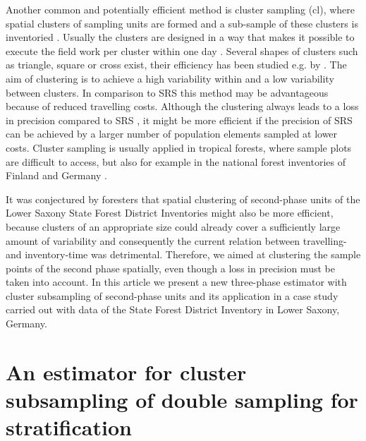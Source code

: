 Another common and potentially efficient method is cluster sampling (cl), where spatial clusters of sampling units are formed and a sub-sample of these clusters is inventoried \citep{Cochran_1977, Gregoire_2008}. Usually the clusters are designed in a way that makes it possible to execute the field work per cluster within one day \citep{Kleinn_1996}. Several shapes of clusters such as triangle, square or cross exist, their efficiency has been studied e.g. by \citet{Kleinn_1994,Kleinn_1996}. The aim of clustering is to achieve a high variability within and a low variability between clusters. In comparison to SRS this method may be advantageous because of reduced travelling costs. Although the clustering always leads to a loss in precision compared to SRS \citep{Cochran_1977}, it might be more efficient if the precision of SRS can be achieved by a larger number of population elements sampled at lower costs. Cluster sampling is usually applied in tropical forests, where sample plots are difficult to access, but 
also for example in the national forest inventories of Finland and Germany \citep{NFI_2009}. 

It was conjectured by foresters that spatial clustering of second-phase units of the Lower Saxony State Forest District Inventories might also be more efficient, because clusters of an appropriate size could already cover a sufficiently large amount of variability and consequently the current relation between travelling- and inventory-time was detrimental. Therefore, we aimed at clustering the sample points of the second phase spatially, even though a loss in precision must be taken into account. In this article we present a new three-phase estimator with cluster subsampling of second-phase units and its application in a case study carried out with data of the State Forest District Inventory in Lower Saxony, Germany. 
\section{An estimator for cluster subsampling of double sampling for stratification}
